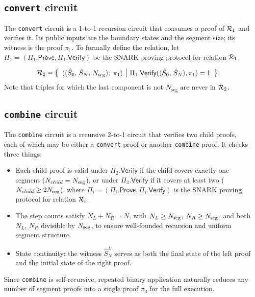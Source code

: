 \subsection{\texttt{convert} circuit}

The \texttt{convert} circuit is a 1-to-1 recursion circuit that consumes a proof of $\mathcal{R}_1$ and verifies it.  Its public
inputs are the boundary states and the segment size; its witness is the proof $\pi_1$. To formally define the relation,
let $\Pi_1=(\Pi_1.\mathsf{Prove}, \Pi_1.\mathsf{Verify})$ be the SNARK proving protocol for relation $\mathcal{R}_1$.

$$\mathcal{R}_2=\left\lbrace\begin{array}{c|c}
	((\hat{S}_0,\, \hat{S}_N,\, {N_{\text{seg}}});\; \pi_1) &
	\Pi_1.\mathsf{Verify}((\hat{S}_0,\, \hat{S}_N), \pi_1)=1
\end{array}\right\rbrace$$
Note that triples for which the last component is not ${N_{\text{seg}}}$ are never in $\mathcal{R}_2$.

\subsection{\texttt{combine} circuit}

The \texttt{combine} circuit is a recursive 2-to-1 circuit that verifies two child proofs, each of which may be either a \texttt{convert} proof or another \texttt{combine} proof.
It checks three things:
\begin{itemize}
\item Each child proof is valid under $\Pi_2.\mathsf{Verify}$ if the child covers exactly one segment ($N_{child}=N_{\mathrm{seg}}$), or under $\Pi_3.\mathsf{Verify}$ if it covers at least two ($N_{child}\ge 2N_{\mathrm{seg}}$), where $\Pi_i=(\Pi_i.\mathsf{Prove}, \Pi_i.\mathsf{Verify})$ is the SNARK proving protocol for relation $\mathcal{R}_i$.
\item The step counts satisfy $N_L + N_R = N$, with $N_L \geq N_{\mathrm{seg}}$, $N_R \geq N_{\mathrm{seg}}$, and both $N_L$, $N_R$ divisible by $N_{\mathrm{seg}}$, to ensure well-founded recursion and uniform segment structure.
\item State continuity: the witness $\hat{S}_N^L$ serves as both the final state of the left proof and the initial state of the right proof.
\end{itemize}
Since \texttt{combine} is self-recursive, repeated binary application naturally reduces any number of segment proofs into a single proof $\pi_3$ for the full execution.

